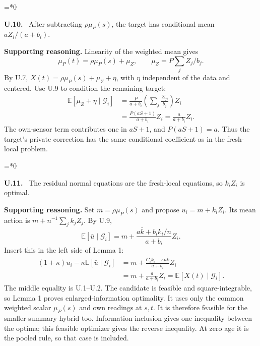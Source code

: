 \documentclass[12pt,letterpaper]{article}
\newcommand{\E}{\mathbb E}
\newcommand{\G}{\mathcal G}
\newenvironment{proofstep}[2]{%
  \begin{list}{}{\leftmargin=\dimexpr 0.17in*#2\relax%
  \setlength{\rightmargin}{0pt}\setlength{\topsep}{5pt}\setlength{\parsep}{2pt}}%
  \item[]\textbf{\textcolor{ink}{#1.}}\ }{\end{list}}
\begin{document}
\begin{proofstep}{U.10}{0}
\label{step:U.10}
After subtracting $\rho\mu_P(s)$, the target has conditional mean $aZ_i/(a+b_i)$.

\textbf{Supporting reasoning.}
Linearity of the weighted mean gives
\[
\mu_P(t)=\rho\mu_P(s)+\mu_Z,\qquad \mu_Z=P\sum_j Z_j/b_j.
\]
By U.7, $X(t)=\rho\mu_P(s)+\mu_Z+\eta$, with $\eta$ independent of the data and centered. Use U.9 to condition the remaining target:
\begin{align*}
\E[\mu_Z+\eta\mid\G_i]
&=\frac{P}{a+b_i}\left(\sum_j\frac{\Sigma_{ji}}{b_j}\right)Z_i\\
&=\frac{P(aS+1)}{a+b_i}Z_i
=\frac{a}{a+b_i}Z_i.
\end{align*}
The own-sensor term contributes one in $aS+1$, and $P(aS+1)=a$. Thus the target's private correction has the same conditional coefficient as in the fresh-local problem.
\par{}
\end{proofstep}

\begin{proofstep}{U.11}{0}
\label{step:U.11}
The residual normal equations are the fresh-local equations, so $k_iZ_i$ is optimal.

\textbf{Supporting reasoning.}
Set $m=\rho\mu_P(s)$ and propose $u_i=m+k_iZ_i$. Its mean action is $m+n^{-1}\sum_jk_jZ_j$. By U.9,
\[
\E[\bar u\mid\G_i]=m+\frac{a\bar k+b_ik_i/n}{a+b_i}Z_i.
\]
Insert this in the left side of Lemma 1:
\begin{align*}
(1+\kappa)u_i-\kappa\E[\bar u\mid\G_i]
&=m+\frac{C_i k_i-\kappa a\bar k}{a+b_i}Z_i\\
&=m+\frac{a}{a+b_i}Z_i
=\E[X(t)\mid\G_i].
\end{align*}
The middle equality is U.1--U.2. The candidate is feasible and square-integrable, so Lemma 1 proves enlarged-information optimality. It uses only the common weighted scalar $\mu_P(s)$ and own readings at $s,t$. It is therefore feasible for the smaller summary hybrid too. Information inclusion gives one inequality between the optima; this feasible optimizer gives the reverse inequality. At zero age it is the pooled rule, so that case is included.
\par{}
\end{proofstep}
\end{document}
